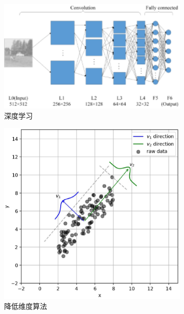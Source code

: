 \begin{figure}[htp]
	 \medskip
	 \begin{subfigure}{.33\textwidth}
	   \centering
	   \includegraphics[width=\linewidth]{eps/2.2.10.eps}
	   \caption{深度学习}
	   \label{fig:2.sub.10}
	 \end{subfigure}\hfil
	 \begin{subfigure}{.33\textwidth}
	   \centering
	   \includegraphics[width=\linewidth]{eps/2.2.11.eps}
	   \caption{降低维度算法}
	   \label{fig:2.sub.11}
	 \end{subfigure}\hfil
	 \begin{subfigure}{.33\textwidth}
	   \centering

\end{subfigure}
\end{figure}

